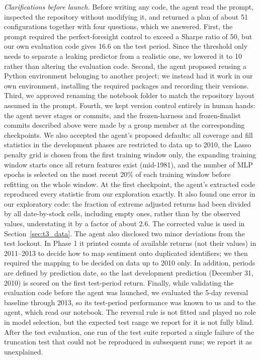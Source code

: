 \textit{Clarifications before launch.} Before writing any code, the agent read the prompt, inspected the repository without modifying it, and returned a plan of about 51 configurations together with four questions, which we answered. First, the prompt required the perfect-foresight control to exceed a Sharpe ratio of 50, but our own evaluation code gives 16.6 on the test period. Since the threshold only needs to separate a leaking predictor from a realistic one, we lowered it to 10 rather than altering the evaluation code. Second, the agent proposed reusing a Python environment belonging to another project; we instead had it work in our own environment, installing the required packages and recording their versions. Third, we approved renaming the notebook folder to match the repository layout assumed in the prompt. Fourth, we kept version control entirely in human hands: the agent never stages or commits, and the frozen-harness and frozen-finalist commits described above were made by a group member at the corresponding checkpoints. We also accepted the agent's proposed defaults: all coverage and fill statistics in the development phases are restricted to data up to 2010, the Lasso penalty grid is chosen from the first training window only, the expanding training window starts once all return features exist (mid-1981), and the number of MLP epochs is selected on the most recent 20\% of each training window before refitting on the whole window. At the first checkpoint, the agent's extracted code reproduced every statistic from our exploration exactly. It also found one error in our exploratory code: the fraction of extreme adjusted returns had been divided by all date-by-stock cells, including empty ones, rather than by the observed values, understating it by a factor of about 2.6. The corrected value is used in Section~\ref{sec:t3_data}. The agent also disclosed two minor deviations from the test lockout. In Phase 1 it printed counts of available returns (not their values) in 2011--2013 to decide how to map sentiment onto duplicated identifiers; we then required the mapping to be decided on data up to 2010 only. In addition, periods are defined by prediction date, so the last development prediction (December 31, 2010) is scored on the first test-period return. Finally, while validating the evaluation code before the agent was launched, we evaluated the 5-day reversal baseline through 2013, so its test-period performance was known to us and to the agent, which read our notebook. The reversal rule is not fitted and played no role in model selection, but the expected test range we report for it is not fully blind. After the test evaluation, one run of the test suite reported a single failure of the truncation test that could not be reproduced in  subsequent runs; we report it as unexplained.

